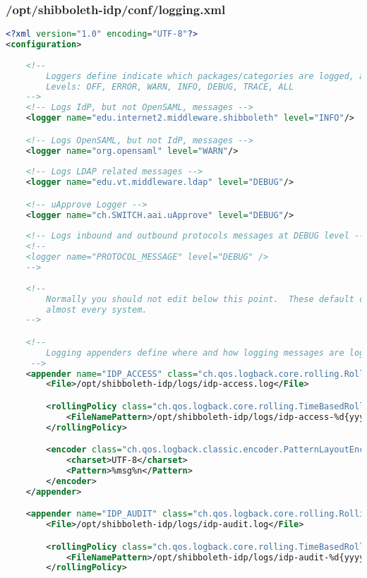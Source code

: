 \subsubsection{/opt/shibboleth-idp/conf/logging.xml}
\begin{lstlisting}[language=xml]
<?xml version="1.0" encoding="UTF-8"?>
<configuration>
    
    <!--
        Loggers define indicate which packages/categories are logged, at which level, and to which appender.
        Levels: OFF, ERROR, WARN, INFO, DEBUG, TRACE, ALL
    -->
    <!-- Logs IdP, but not OpenSAML, messages -->
    <logger name="edu.internet2.middleware.shibboleth" level="INFO"/>

    <!-- Logs OpenSAML, but not IdP, messages -->
    <logger name="org.opensaml" level="WARN"/>
    
    <!-- Logs LDAP related messages -->
    <logger name="edu.vt.middleware.ldap" level="DEBUG"/>

    <!-- uApprove Logger -->
    <logger name="ch.SWITCH.aai.uApprove" level="DEBUG"/>
    
    <!-- Logs inbound and outbound protocols messages at DEBUG level -->
    <!--
    <logger name="PROTOCOL_MESSAGE" level="DEBUG" />
    -->
    
    <!-- 
        Normally you should not edit below this point.  These default configurations are sufficient for 
        almost every system.
    -->

    <!-- 
        Logging appenders define where and how logging messages are logged.
     -->
    <appender name="IDP_ACCESS" class="ch.qos.logback.core.rolling.RollingFileAppender">
        <File>/opt/shibboleth-idp/logs/idp-access.log</File>

        <rollingPolicy class="ch.qos.logback.core.rolling.TimeBasedRollingPolicy">
            <FileNamePattern>/opt/shibboleth-idp/logs/idp-access-%d{yyyy-MM-dd}.log</FileNamePattern>
        </rollingPolicy>

        <encoder class="ch.qos.logback.classic.encoder.PatternLayoutEncoder">
            <charset>UTF-8</charset>
            <Pattern>%msg%n</Pattern>
        </encoder>
    </appender>

    <appender name="IDP_AUDIT" class="ch.qos.logback.core.rolling.RollingFileAppender">
        <File>/opt/shibboleth-idp/logs/idp-audit.log</File>

        <rollingPolicy class="ch.qos.logback.core.rolling.TimeBasedRollingPolicy">
            <FileNamePattern>/opt/shibboleth-idp/logs/idp-audit-%d{yyyy-MM-dd}.log</FileNamePattern>
        </rollingPolicy>


\end{lstlisting}
